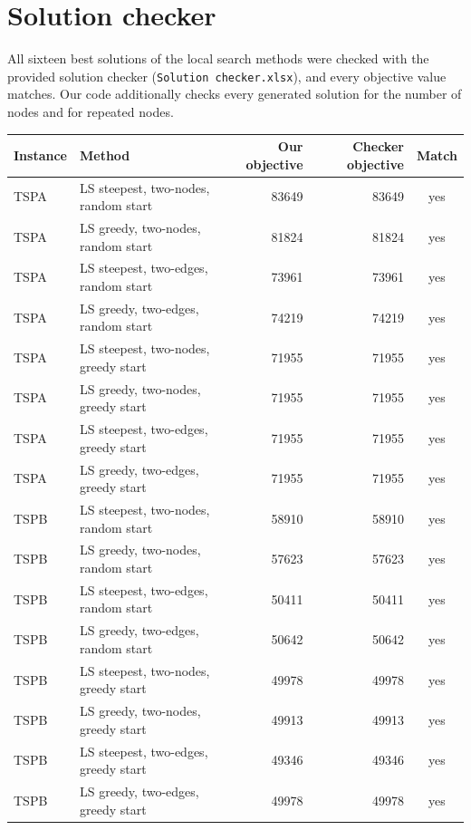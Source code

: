 \documentclass[11pt,a4paper]{article}
\begin{document}
\section{Solution checker}
All sixteen best solutions of the local search methods were checked with the provided solution
checker (\texttt{Solution checker.xlsx}), and every objective value matches. Our code additionally
checks every generated solution for the number of nodes and for repeated nodes.
\begin{table}[H]
\centering
\small
\begin{tabular}{llrrc}
\toprule
Instance & Method & Our objective & Checker objective & Match \\
\midrule
TSPA & LS steepest, two-nodes, random start & 83649 & 83649 & yes \\
TSPA & LS greedy, two-nodes, random start & 81824 & 81824 & yes \\
TSPA & LS steepest, two-edges, random start & 73961 & 73961 & yes \\
TSPA & LS greedy, two-edges, random start & 74219 & 74219 & yes \\
TSPA & LS steepest, two-nodes, greedy start & 71955 & 71955 & yes \\
TSPA & LS greedy, two-nodes, greedy start & 71955 & 71955 & yes \\
TSPA & LS steepest, two-edges, greedy start & 71955 & 71955 & yes \\
TSPA & LS greedy, two-edges, greedy start & 71955 & 71955 & yes \\
\midrule
TSPB & LS steepest, two-nodes, random start & 58910 & 58910 & yes \\
TSPB & LS greedy, two-nodes, random start & 57623 & 57623 & yes \\
TSPB & LS steepest, two-edges, random start & 50411 & 50411 & yes \\
TSPB & LS greedy, two-edges, random start & 50642 & 50642 & yes \\
TSPB & LS steepest, two-nodes, greedy start & 49978 & 49978 & yes \\
TSPB & LS greedy, two-nodes, greedy start & 49913 & 49913 & yes \\
TSPB & LS steepest, two-edges, greedy start & 49346 & 49346 & yes \\
TSPB & LS greedy, two-edges, greedy start & 49978 & 49978 & yes \\
\bottomrule
\end{tabular}
\end{table}
\end{document}
